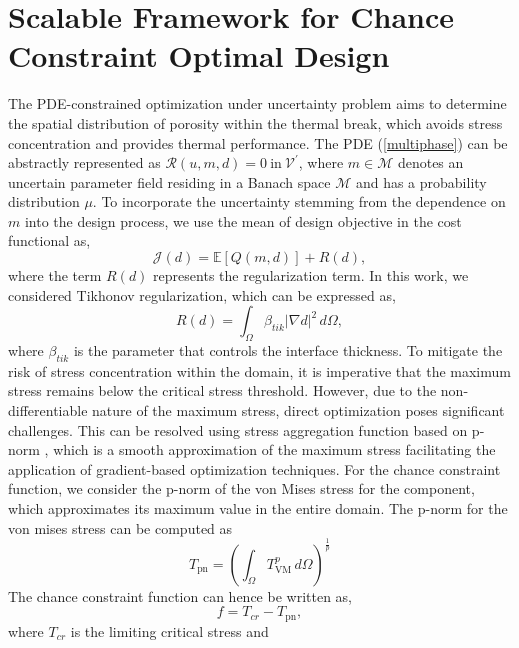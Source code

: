 \documentclass[pdf-a,balance,colorlinks,upint,subscriptcorrection,varvw,mathalfa=cal=boondoxo, spanish,french,vietnamese,russian,greek]{asmeconf}
\begin{document}
\section{Scalable Framework for Chance Constraint Optimal Design}
\noindent
The PDE-constrained optimization under uncertainty problem aims to determine the spatial distribution of porosity within the thermal break, which avoids stress concentration and provides thermal performance. 
%
The PDE  (\ref{multiphase}) can be abstractly represented as $\mathcal{R}(u,m,d) = 0 \: \text{in} \: \mathcal{V}^{'}$,
where $m \in \mathcal{M}$ denotes an uncertain parameter field residing in a Banach space $\mathcal{M}$ and has a probability distribution $\mu$.
To incorporate the uncertainty stemming from the dependence on $m$ into the design process, we use the mean of design objective in the cost functional as,
    \begin{equation}\label{mean cost functional}
        \mathcal{J}(d) = \mathbb{E}[Q(m,d)] + R(d), 
    \end{equation}
where the term $R(d)$ represents the regularization term. In this work, we considered Tikhonov regularization, which can be expressed as,
\begin{equation*}
    R (d) = \int_{\Omega}  \beta_{tik} {|\nabla d|}^2  \,d \Omega, 
\end{equation*}
where $\beta_{tik}$ is the parameter that controls the interface thickness.
To mitigate the risk of stress concentration within the domain, it is imperative that the maximum stress remains below the critical stress threshold. However, due to the non-differentiable nature of the maximum stress, direct optimization poses significant challenges. This can be resolved using stress aggregation function based on p-norm \cite{le2010stress}, which is a smooth approximation of the maximum stress facilitating the application of gradient-based optimization techniques.
For the chance constraint function, we consider the p-norm of the von Mises stress for the component, which approximates its maximum value in the entire domain. The p-norm for the von mises stress can be computed as
\begin{equation}
    T_{\text{pn}} = {\left( \int_{\Omega} T_{\text{VM}}^{p} \,d \Omega \right)}^{\frac{1}{p}}
\end{equation}
The chance constraint function can hence be written as,
\begin{equation}
    f = T_{cr} - T_{\text{pn}},
\end{equation}
where $T_{cr}$ is the limiting critical stress and 
\end{document}
